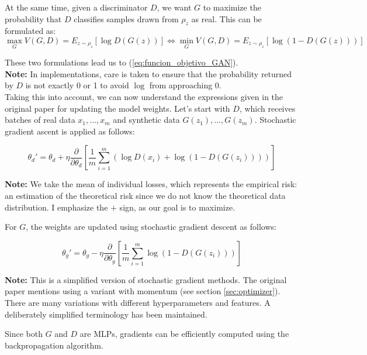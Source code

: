 At the same time, given a discriminator $D$, we want $G$ to maximize the probability that $D$ classifies samples drawn from $\rho_z$ as real. This can be formulated as:
\begin{equation*}
\max_G V(G,D) = E_{z \sim \rho_z}[\log D(G(z))] \Leftrightarrow \min_G V(G,D) = E_{z \sim \rho_z} [\log(1 - D(G(z)))]
\end{equation*}

These two formulations lead us to (\ref{eq:funcion_objetivo_GAN}).\\
\textbf{Note:} In implementations, care is taken to ensure that the probability returned by $D$ is not exactly 0 or 1 to avoid $\log$ from approaching 0.\\

Taking this into account, we can now understand the expressions given in the original paper \cite{goodfellow2014} for updating the model weights. Let's start with $D$, which receives batches of real data ${x_1,...,x_m}$ and synthetic data ${G(z_1),...,G(z_m)}$. Stochastic gradient ascent is applied as follows:

\begin{equation*}
\theta_{d}' = \theta_d + \eta \frac{\partial }{\partial \theta_d} \left[ \frac{1}{m} \sum_{i=1}^m \left( \log D(x_i) + \log (1 - D(G(z_i))) \right) \right]
\end{equation*}

\textbf{Note:} We take the mean of individual losses, which represents the empirical risk: an estimation of the theoretical risk since we do not know the theoretical data distribution. I emphasize the $+$ sign, as our goal is to maximize.

For $G$, the weights are updated using stochastic gradient descent as follows:

\begin{equation*}
\theta_{g}' = \theta_g - \eta \frac{\partial}{\partial \theta_g} \left[ \frac{1}{m} \sum_{i=1}^m \log(1 - D(G(z_i))) \right]
\end{equation*}

\textbf{Note:} This is a simplified version of stochastic gradient methods. The original paper mentions using a variant with momentum (see section \ref{sec:optimizer}). There are many variations with different hyperparameters and features. A deliberately simplified terminology has been maintained.

Since both $G$ and $D$ are MLPs, gradients can be efficiently computed using the backpropagation algorithm.

